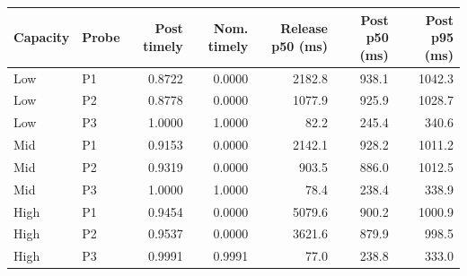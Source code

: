 \begin{tabular}{@{}llrrrrr@{}}
\toprule
Capacity & Probe & Post timely & Nom. timely & Release p50 (ms) & Post p50 (ms) & Post p95 (ms) \\
\midrule
Low & P1 & 0.8722 & 0.0000 & 2182.8 & 938.1 & 1042.3 \\
Low & P2 & 0.8778 & 0.0000 & 1077.9 & 925.9 & 1028.7 \\
Low & P3 & 1.0000 & 1.0000 & 82.2 & 245.4 & 340.6 \\
Mid & P1 & 0.9153 & 0.0000 & 2142.1 & 928.2 & 1011.2 \\
Mid & P2 & 0.9319 & 0.0000 & 903.5 & 886.0 & 1012.5 \\
Mid & P3 & 1.0000 & 1.0000 & 78.4 & 238.4 & 338.9 \\
High & P1 & 0.9454 & 0.0000 & 5079.6 & 900.2 & 1000.9 \\
High & P2 & 0.9537 & 0.0000 & 3621.6 & 879.9 & 998.5 \\
High & P3 & 0.9991 & 0.9991 & 77.0 & 238.8 & 333.0 \\
\bottomrule
\end{tabular}